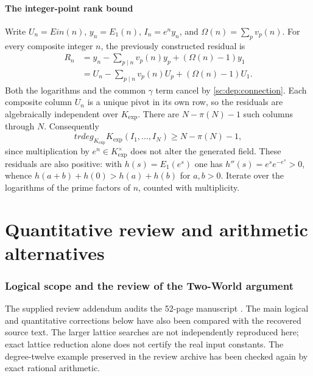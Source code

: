 \documentclass[11pt,a4paper]{article}
\theoremstyle{definition}
\theoremstyle{remark}
\theoremstyle{plain}
\numberwithin{equation}{section}
\def\operatorname#1{#1}\def\mathrm#1{#1}}
\begin{document}
\subsection{The integer-point rank bound}
\label{sc:dep:integer-rank}

Write $U_n=\operatorname{Ein}(n)$, $y_n=E_1(n)$,
$I_n=e^ny_n$, and $\Omega(n)=\sum_pv_p(n)$.
For every composite integer $n$, the previously constructed residual is
\begin{align*}
 R_n&=y_n-\sum_{p\mid n}v_p(n)y_p+(\Omega(n)-1)y_1\\
 &=U_n-\sum_{p\mid n}v_p(n)U_p+(\Omega(n)-1)U_1.
\end{align*}
Both the logarithms and the common $\gamma$ term cancel by
\eqref{sc:dep:connection}. Each composite column $U_n$ is a unique pivot
in its own row, so the residuals are algebraically independent over
$K_{\exp}$. There are $N-\pi(N)-1$ such columns through $N$.
Consequently
\begin{equation}\label{sc:dep:I-rank}
 \operatorname{trdeg}_{K_{\exp}}K_{\exp}(I_1,\ldots,I_N)
 \ge N-\pi(N)-1,
\end{equation}
since multiplication by $e^n\in K_{\exp}^{\times}$ does not alter
the generated field. These residuals are also positive: with
$h(s)=E_1(e^s)$ one has $h''(s)=e^se^{-e^s}>0$, whence
$h(a+b)+h(0)>h(a)+h(b)$ for $a,b>0$. Iterate over the logarithms
of the prime factors of $n$, counted with multiplicity.



\clearpage
\part{Quantitative review and arithmetic alternatives}

\section{Logical scope and the review of the Two-World argument}
The supplied review addendum audits the 52-page manuscript \cite{KEIO}. The main logical and quantitative corrections below have also been compared with the recovered source text. The larger lattice searches are not independently reproduced here; exact lattice reduction alone does not certify the real input constants. The degree-twelve example preserved in the review archive has been checked again by exact rational arithmetic.
\end{document}

